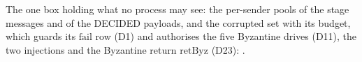 \begin{definition}
  \label{def:aba-netadv}
  \leanok
  The one box holding what no process may see: the per-sender pools of the stage messages and of the DECIDED payloads, and the corrupted set with its budget, which guards its $\mathrm{fail}$ row (D1) and authorises the five Byzantine drives (D11), the two injections and the Byzantine return $\mathrm{retByz}$ (D23): .
\end{definition}
